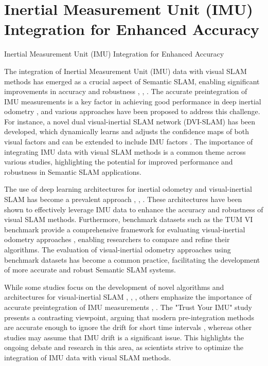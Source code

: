 \documentclass[conference]{IEEEtran}
\begin{document}
\section{Inertial Measurement Unit (IMU) Integration for Enhanced Accuracy}
Inertial Measurement Unit (IMU) Integration for Enhanced Accuracy

The integration of Inertial Measurement Unit (IMU) data with visual SLAM methods has emerged as a crucial aspect of Semantic SLAM, enabling significant improvements in accuracy and robustness \cite{b1}, \cite{b2}, \cite{b3}. The accurate preintegration of IMU measurements is a key factor in achieving good performance in deep inertial odometry \cite{b2}, and various approaches have been proposed to address this challenge. For instance, a novel dual visual-inertial SLAM network (DVI-SLAM) has been developed, which dynamically learns and adjusts the confidence maps of both visual factors and can be extended to include IMU factors \cite{b3}. The importance of integrating IMU data with visual SLAM methods is a common theme across various studies, highlighting the potential for improved performance and robustness in Semantic SLAM applications.

The use of deep learning architectures for inertial odometry and visual-inertial SLAM has become a prevalent approach \cite{b1}, \cite{b2}, \cite{b3}. These architectures have been shown to effectively leverage IMU data to enhance the accuracy and robustness of visual SLAM methods. Furthermore, benchmark datasets such as the TUM VI benchmark provide a comprehensive framework for evaluating visual-inertial odometry approaches \cite{b4}, enabling researchers to compare and refine their algorithms. The evaluation of visual-inertial odometry approaches using benchmark datasets has become a common practice, facilitating the development of more accurate and robust Semantic SLAM systems.

While some studies focus on the development of novel algorithms and architectures for visual-inertial SLAM \cite{b1}, \cite{b2}, \cite{b3}, others emphasize the importance of accurate preintegration of IMU measurements \cite{b2}, \cite{b5}. The "Trust Your IMU" study presents a contrasting viewpoint, arguing that modern pre-integration methods are accurate enough to ignore the drift for short time intervals \cite{b5}, whereas other studies may assume that IMU drift is a significant issue. This highlights the ongoing debate and research in this area, as scientists strive to optimize the integration of IMU data with visual SLAM methods.
\end{document}
